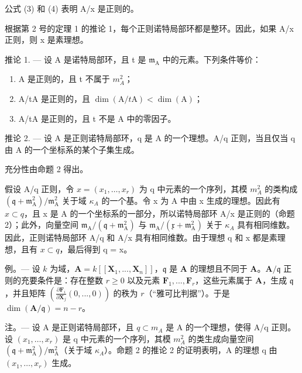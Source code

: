公式 (3) 和 (4) 表明 A/x 是正则的。

根据第 2 号的定理 1 的推论 1，每个正则诺特局部环都是整环。因此，如果 A/x 正则，则 x 是素理想。

推论 1. --- 设 A 是诺特局部环，且 t 是 \(\mathfrak{m}_{\mathrm{A}}\) 中的元素。下列条件等价：

\begin{enumerate}
\def\labelenumi{(\roman{enumi})}
\item
  A 是正则的，且 t 不属于 \(m_{A}^{2}\)；
\item
  A/tA 是正则的，且 \(\dim(\mathrm{A}/t\mathrm{A}) < \dim(\mathrm{A})\)；
\item
  A/tA 是正则的，且 t 不是 A 中的零因子。
\end{enumerate}

推论 2. --- 设 A 是正则诺特局部环，q 是 A 的一个理想。A/q 正则，当且仅当 q 由 A 的一个坐标系的某个子集生成。

充分性由命题 2 得出。

假设 A/q 正则，令 \(x = (x_{1}, \ldots, x_{r})\) 为 q 中元素的一个序列，其模 \(m_{A}^{2}\) 的类构成 \((\mathfrak{q} + \mathfrak{m}_{\mathrm{A}}^{2})/\mathfrak{m}_{\mathrm{A}}^{2}\) 关于域 \(\kappa_{A}\) 的一个基。令 x 为 A 中由 x 生成的理想。因此有 \(x \subset q\)，且 x 是 A 的一个坐标系的一部分，所以诺特局部环 A/x 是正则的（命题 2）；此外，向量空间 \(\mathfrak{m}_{\mathrm{A}}/(\mathfrak{q} + \mathfrak{m}_{\mathrm{A}}^{2})\) 与 \(\mathfrak{m}_{\mathrm{A}}/(\mathfrak{x} + \mathfrak{m}_{\mathrm{A}}^{2})\) 关于 \(\kappa_{A}\) 具有相同维数。因此，正则诺特局部环 A/q 和 A/x 具有相同维数。由于理想 q 和 x 都是素理想，且有 \(x \subset q\)，最后得到 q = x。

例。--- 设 \(k\) 为域，\(\mathbf{A} = k[[\mathbf{X}_1, ..., \mathbf{X}_n]]\)，\(\mathfrak{q}\) 是 \(\mathbf{A}\) 的理想且不同于 \(\mathbf{A}\)。\(\mathbf{A}/\mathfrak{q}\) 正则的充要条件是：存在整数 \(r \geqslant 0\) 以及元素 \(\mathbf{F}_1, ..., \mathbf{F}_r\)，这些元素属于 \(\mathbf{A}\)，生成 \(\mathfrak{q}\)，并且矩阵 \(\left(\frac{\partial\mathbf{F}_i}{\partial\mathbf{X}_j}(0, ..., 0)\right)\) 的秩为 \(r\)（“雅可比判据”）。于是 \(\dim(\mathbf{A}/\mathfrak{q}) = n - r\)。

注。--- 设 A 是正则诺特局部环，且 \(q \subset m_{A}\) 是 A 的一个理想，使得 A/q 正则。设 \((x_{1}, \ldots, x_{r})\) 是 q 中元素的一个序列，其模 \(m_{A}^{2}\) 的类生成向量空间 \((\mathfrak{q} + \mathfrak{m}_{\mathrm{A}}^{2}) / \mathfrak{m}_{\mathrm{A}}^{2}\)（关于域 \(\kappa_{A}\)）。命题 2 的推论 2 的证明表明，A 的理想 q 由 \((x_{1}, \ldots, x_{r})\) 生成。

